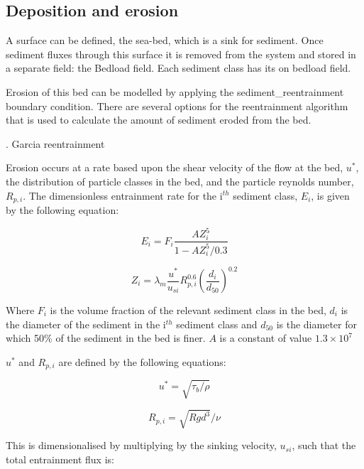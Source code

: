 \subsection{Deposition and erosion}

A surface can be defined, the sea-bed, which is a sink for sediment. Once sediment
fluxes through this surface it is removed from the system and stored in a separate 
field: the Bedload field. Each sediment class has its on bedload field.

Erosion of this bed can be modelled by applying the sediment\_reentrainment boundary
condition. There are several options for the reentrainment algorithm that is used to
calculate the amount of sediment eroded from the bed.

. Garcia reentrainment

Erosion occurs at a rate based upon the shear velocity of the flow at the bed, $u^*$, the
distribution of particle classes in the bed, and the particle reynolds number,
$R_{p,i}$. The dimensionless entrainment rate for the i$^{th}$ sediment class, $E_i$, is
given by the following equation:

\begin{equation}\label{eq:dimensionless_entrainment}
  E_i = F_i \frac{AZ_i^5}{1-AZ_i^5/0.3}
\end{equation}

\begin{equation}\label{eq:dimensionless_entrainment_Z}
  Z_i = \lambda_m \frac{u^*}{u_{si}} R_{p,i}^{0.6} \left (\frac{d_i}{d_{50}} \right)^{0.2}
\end{equation}

\noindent
Where $F_i$ is the volume fraction of the relevant sediment class in the bed, $d_i$ is the
diameter of the sediment in the i$^{th}$ sediment class and $d_{50}$ is the diameter for
which 50\% of the sediment in the bed is finer. $A$ is a constant of value $1.3 \times 10^7$ 

\noindent
$u^*$ and $R_{p,i}$ are defined by the following equations:

\begin{equation}\label{eq:shear_velocity}
u^* = \sqrt{\tau_b/\rho}
\end{equation}

\begin{equation}\label{eq:particle_reynolds_number}
R_{p,i} = \sqrt{Rgd^{3}}/\nu
\end{equation}

This is dimensionalised by multiplying by the sinking velocity, $u_{si}$, such that the
total entrainment flux is:

